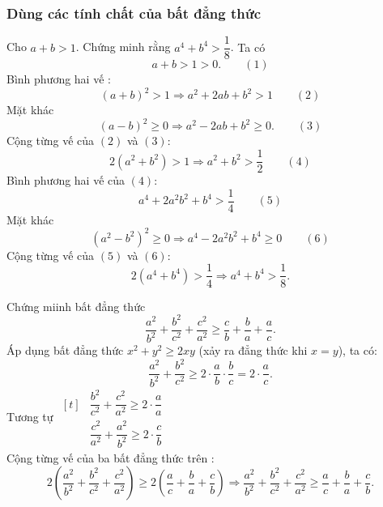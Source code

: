 \subsubsection{Dùng các tính chất của bất đẳng thức}
\begin{vd}%
	Cho $a+b>1$. Chứng minh rằng $a^4+b^4>\dfrac{1}{8}$.
	\loigiai
	{
	Ta có $$a+b>1>0.\quad\quad (1)$$
	Bình phương hai vế : $$(a+b)^2>1\Rightarrow a^2+2ab+b^2>1\quad\quad (2)$$
	Mặt khác $$(a-b)^2\geq 0\Rightarrow a^2-2ab+b^2\geq 0.\quad\quad (3)$$
	Cộng từng vế của $(2)$ và $(3)$:
	$$2(a^2+b^2)>1\Rightarrow a^2+b^2>\dfrac{1}{2}\quad\quad (4)$$
	Bình phương hai vế của $(4)$:
	$$a^4+2a^2b^2+b^4>\dfrac{1}{4}\quad\quad (5)$$
	Mặt khác $$\left(a^2-b^2\right)^2\geq 0\Rightarrow a^4-2a^2b^2+b^4\geq 0\quad\quad (6)$$
	Cộng từng vế của $(5)$ và $(6)$:
	$$2\left(a^4+b^4\right)>\dfrac{1}{4}\Rightarrow a^4+b^4>\dfrac{1}{8}.$$
	}
\end{vd}
\begin{vd}%
Chứng miinh bất đẳng thức $$\dfrac{a^2}{b^2}+\dfrac{b^2}{c^2}+\dfrac{c^2}{a^2}\geq \dfrac{c}{b}+\dfrac{b}{a}+\dfrac{a}{c}.$$
	\loigiai
	{
	Áp dụng bất đẳng thức $x^2+y^2\geq 2xy$ (xảy ra đẳng thức khi $x=y$), ta có:
	$$\dfrac{a^2}{b^2}+\dfrac{b^2}{c^2}\geq 2\cdot \dfrac{a}{b}\cdot \dfrac{b}{c}=2\cdot \dfrac{a}{c}.$$
	Tương tự $\begin{aligned}[t]
		&\dfrac{b^2}{c^2}+\dfrac{c^2}{a^2}\geq 2\cdot\dfrac{a}{a}\\
		&\dfrac{c^2}{a^2}+\dfrac{a^2}{b^2}\geq 2\cdot\dfrac{c}{b}
	\end{aligned}$\\
	Cộng từng vế của ba bất đẳng thức trên : 
	$$2\left(\dfrac{a^2}{b^2}+\dfrac{b^2}{c^2}+\dfrac{c^2}{a^2}\right)\geq 2\left(\dfrac{a}{c}+\dfrac{b}{a}+\dfrac{c}{b}\right)\Rightarrow \dfrac{a^2}{b^2}+\dfrac{b^2}{c^2}+\dfrac{c^2}{a^2}\geq \dfrac{a}{c}+\dfrac{b}{a}+\dfrac{c}{b}.$$
	}
\end{vd}
